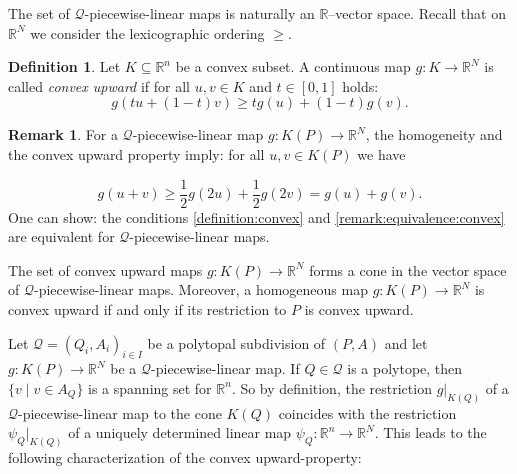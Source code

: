 \documentclass[12pt, a4article]{amsart}   	%
\numberwithin{equation}{section}
\theoremstyle{plain}
\theoremstyle{definition}
\newtheorem{remark}[theorem]{Remark}
\newtheorem{definition}[theorem]{Definition}
\newcommand{\R}{{\mathbb R}}
\begin{document}
The set of $\mathcal Q$-piecewise-linear maps is naturally an $\R$--vector space.
Recall that on $\mathbb{R}^N$ we consider the lexicographic ordering $\geq$. 

\begin{definition}\label{def:convex:upward}
Let $K\subseteq \mathbb R^n$ be a convex subset.
A continuous map $g:K\rightarrow \mathbb R^N$ is called \emph{convex upward} if for all $u, v\in K$ and $t\in[0,1]$ holds:  
\begin{equation}\label{definition:convex}
g(tu+(1-t)v) \geq tg(u)+(1-t)g(v).
\end{equation} 
\end{definition}

 \begin{remark}\label{convex:equivalent}\rm
For a $\mathcal Q$-piecewise-linear map $g:K(P)\rightarrow \mathbb R^N$, the homogeneity and the convex upward property imply: for all 
$u, v\in K(P)$ we have

\begin{equation}\label{remark:equivalence:convex}
g(u+v) \ge  \frac{1}{2}g(2u)+\frac{1}{2}g(2v)=g(u)+g(v).
\end{equation} 
One can show: the conditions \eqref{definition:convex} and \eqref{remark:equivalence:convex} are equivalent for $\mathcal Q$-piecewise-linear maps.
\end{remark}

The set of convex upward maps $g:K(P)\to\mathbb{R}^N$ forms a cone in the vector space of $\mathcal{Q}$-piecewise-linear maps. Moreover, a homogeneous map $g:K(P)\longrightarrow\R^N$ is convex upward if and only if its restriction to $P$ is convex upward.

Let $\mathcal Q=(Q_i,A_i)_{i\in I}$ be a polytopal subdivision of  $(P, A)$ and let $g:K(P)\rightarrow \mathbb R^N$ be a $\mathcal Q$-piecewise-linear map. If $Q\in \mathcal Q$ is a polytope, then $\{v \mid v\in A_Q\}$ is a spanning set for $\mathbb R^n$. So by definition, the restriction $g\vert_{K(Q)}$ of a $\mathcal Q$-piecewise-linear map to the cone $K(Q)$ coincides with the restriction $\psi_Q\vert_{K(Q)}$ of a uniquely determined linear map $\psi_Q:\mathbb R^n\rightarrow \mathbb R^N$. This leads to the following characterization of the convex upward-property:
\end{document}
